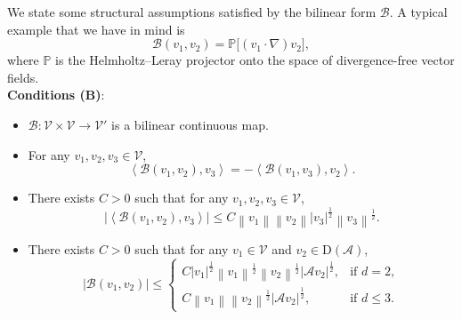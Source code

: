 \documentclass[11pt, reqno]{amsart}
\theoremstyle{definition}
\numberwithin{equation}{section}
\newcommand{\bb}{\mathbb}
\newcommand{\norm}[1]{\left\|{#1}\right\|}
\newcommand{\inpro}[2]{\left\langle#1,#2\right\rangle}
\newcommand{\abs}[1]{\left|{#1}\right|}
\begin{document}
We state some structural assumptions satisfied by the bilinear form $\mathcal{B}$. A typical example that we have in mind is 
\[
\mathcal{B}(v_1,v_2)= \bb{P}\big[(v_1\cdot\nabla)v_2\big],
\]
where $\bb{P}$ is the Helmholtz--Leray projector onto the space of divergence-free vector fields.
\\[1ex]
\textbf{Conditions (B)}:
\begin{itemize}
	\item[(B1)] $\mathcal{B}:\mathcal{V}\times \mathcal{V} \to \mathcal{V}'$ is a bilinear continuous map.
	\item[(B2)] For any $v_1,v_2,v_3 \in \mathcal{V}$,
	\begin{equation}\label{equ:B antisym}
		\inpro{\mathcal{B}(v_1,v_2)}{v_3} = -\inpro{\mathcal{B}(v_1,v_3)}{v_2}.
	\end{equation}
	\item[(B3)] There exists $C>0$ such that for any $v_1,v_2,v_3\in \mathcal{V}$,
	\begin{equation}\label{equ:est B 3d alt}
		\abs{\inpro{\mathcal{B}(v_1,v_2)}{v_3}}
		\leq
		C \norm{v_1} \norm{v_2} \abs{v_3}^{\frac12} \norm{v_3}^{\frac12}.%
	\end{equation}
	\item[(B4)] There exists $C>0$ such that for any $v_1\in \mathcal{V}$ and $v_2\in \mathrm{D}(\mathcal{A})$,
	\begin{equation}\label{equ:est B with A}
		\abs{\mathcal{B}(v_1,v_2)}
		\leq
		\begin{cases}
			C \abs{v_1}^{\frac12} \norm{v_1}^{\frac12} \norm{v_2}^{\frac12} \abs{\mathcal{A}v_2}^{\frac12}, &\text{if $d=2$},
			\\[1ex]
			C \norm{v_1} \norm{v_2}^{\frac12} \abs{\mathcal{A} v_2}^{\frac12}, &\text{if $d\le 3$}.
		\end{cases}
	\end{equation}

\end{itemize}
\end{document}
